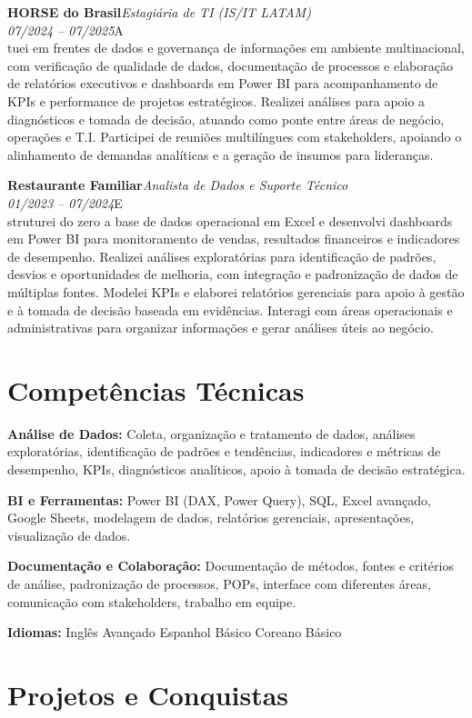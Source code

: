\documentclass[11pt,a4paper]{article}
\newcommand{\cvrole}[4]{%
  \vspace{4pt}%
  {\bfseries\color{accentcolor}#1}\hfill{\itshape #2}\\[-2pt]%
  {\itshape #3}\hfill #4\\[6pt]%
}
\begin{document}
\cvrole{HORSE do Brasil}{Estagiária de TI (IS/IT LATAM)}{07/2024 -- 07/2025}

Atuei em frentes de dados e governança de informações em ambiente multinacional, com verificação de qualidade de dados, documentação de processos e elaboração de relatórios executivos e dashboards em Power BI para acompanhamento de KPIs e performance de projetos estratégicos. Realizei análises para apoio a diagnósticos e tomada de decisão, atuando como ponte entre áreas de negócio, operações e T.I. Participei de reuniões multilíngues com stakeholders, apoiando o alinhamento de demandas analíticas e a geração de insumos para lideranças.

\cvrole{Restaurante Familiar}{Analista de Dados e Suporte Técnico}{01/2023 -- 07/2024}

Estruturei do zero a base de dados operacional em Excel e desenvolvi dashboards em Power BI para monitoramento de vendas, resultados financeiros e indicadores de desempenho. Realizei análises exploratórias para identificação de padrões, desvios e oportunidades de melhoria, com integração e padronização de dados de múltiplas fontes. Modelei KPIs e elaborei relatórios gerenciais para apoio à gestão e à tomada de decisão baseada em evidências. Interagi com áreas operacionais e administrativas para organizar informações e gerar análises úteis ao negócio.

\section{Competências Técnicas}

\textbf{Análise de Dados:} Coleta, organização e tratamento de dados, análises exploratórias, identificação de padrões e tendências, indicadores e métricas de desempenho, KPIs, diagnósticos analíticos, apoio à tomada de decisão estratégica.

\textbf{BI e Ferramentas:} Power BI (DAX, Power Query), SQL, Excel avançado, Google Sheets, modelagem de dados, relatórios gerenciais, apresentações, visualização de dados.

\textbf{Documentação e Colaboração:} Documentação de métodos, fontes e critérios de análise, padronização de processos, POPs, interface com diferentes áreas, comunicação com stakeholders, trabalho em equipe.

\textbf{Idiomas:} Inglês Avançado \enspace\textbullet\enspace Espanhol Básico \enspace\textbullet\enspace Coreano Básico

\section{Projetos e Conquistas}
\end{document}
